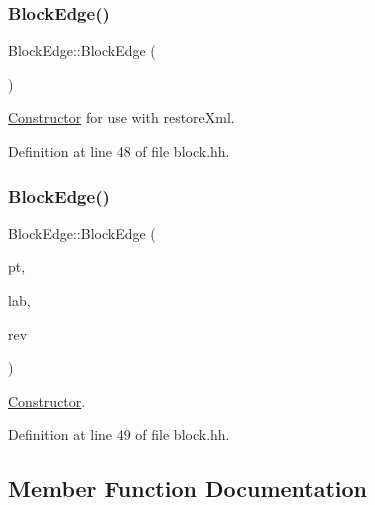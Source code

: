 \subsubsection{\texorpdfstring{BlockEdge()}{BlockEdge()}\hspace{0.1cm}{\footnotesize\ttfamily [1/2]}}
{\footnotesize\ttfamily Block\+Edge\+::\+Block\+Edge (\begin{DoxyParamCaption}\item[{void}]{ }\end{DoxyParamCaption})\hspace{0.3cm}{\ttfamily [inline]}}



\mbox{\hyperlink{class_constructor}{Constructor}} for use with restore\+Xml. 



Definition at line 48 of file block.\+hh.

\mbox{\label{struct_block_edge_a150bd75f391dbef47afe40387873edce}} 
\subsubsection{\texorpdfstring{BlockEdge()}{BlockEdge()}\hspace{0.1cm}{\footnotesize\ttfamily [2/2]}}
{\footnotesize\ttfamily Block\+Edge\+::\+Block\+Edge (\begin{DoxyParamCaption}\item[{\mbox{\hyperlink{class_flow_block}{Flow\+Block}} $\ast$}]{pt,  }\item[{uint4}]{lab,  }\item[{int4}]{rev }\end{DoxyParamCaption})\hspace{0.3cm}{\ttfamily [inline]}}



\mbox{\hyperlink{class_constructor}{Constructor}}. 



Definition at line 49 of file block.\+hh.



\subsection{Member Function Documentation}
\mbox{\label{struct_block_edge_ab1e094751e834170c101f2a29302572a}} 
